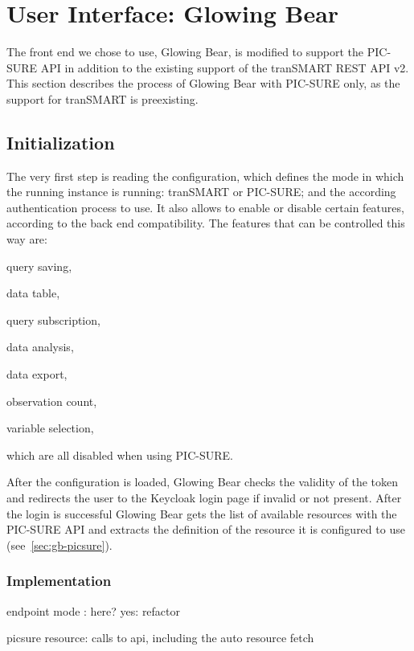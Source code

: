 \section{User Interface: Glowing Bear}

The front end we chose to use, Glowing Bear, is modified to support the PIC-SURE API in addition to the existing support of the tranSMART REST API v2.
This section describes the process of Glowing Bear with PIC-SURE only, as the support for tranSMART is preexisting.

\subsection{Initialization}

The very first step is reading the configuration, which defines the mode in which the running instance is running: tranSMART or PIC-SURE; and the according authentication process to use.
It also allows to enable or disable certain features, according to the back end compatibility.
The features that can be controlled this way are:
\begin{enumerate*}
    \item query saving,
    \item data table,
    \item query subscription,
    \item data analysis,
    \item data export,
    \item observation count,
    \item variable selection,
\end{enumerate*}
which are all disabled when using PIC-SURE.

After the configuration is loaded, Glowing Bear checks the validity of the token and redirects the user to the Keycloak login page if invalid or not present.
After the login is successful Glowing Bear gets the list of available resources with the PIC-SURE API and extracts the definition of the resource it is configured to use (see~\ref{sec:gb-picsure}).



\subsubsection*{Implementation}

endpoint mode : here? yes: refactor

picsure resource: calls to api, including the auto resource fetch

